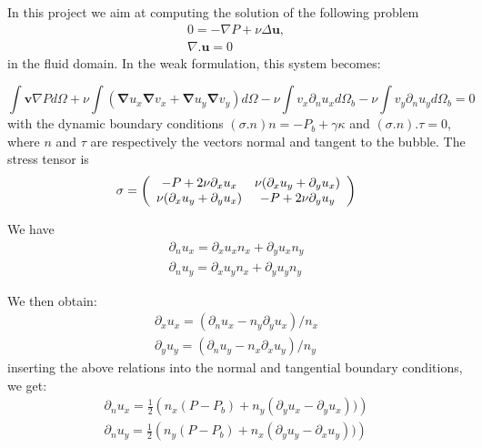 \documentclass[11pt]{article}
\begin{document}
In this project we aim at computing the solution of the following problem
\begin{align}
    0=-\nabla P+\nu \Delta  \mathbf u, \\
    \nabla.{\mathbf u}=0
\end{align}
in the fluid domain.
In the weak formulation, this system becomes:

\begin{equation}
\int {\mathbf v}\nabla P d\Omega+\nu\int \left({\mathbf \nabla} u_x {\mathbf \nabla} v_x + {\mathbf \nabla} u_y {\mathbf \nabla} v_y \right)d\Omega
-\nu \int v_x\partial_n u_x d\Omega_b-\nu \int v_y\partial_n u_y d\Omega_b=0
\end{equation}
with the dynamic boundary conditions $(\sigma.n)n=-P_b+\gamma \kappa$ and $(\sigma.n).\tau=0$, where $n$ and $\tau$ are respectively the vectors normal and tangent to the bubble.
The stress tensor is
\begin{equation}
    \sigma=\left(
    \begin{array}{cc}
    -P +2\nu \partial_x u_x &\nu(\partial_x u_y+\partial_y u_x)\cr
    \nu(\partial_x u_y+\partial_y u_x) &-P +2\nu \partial_y u_y
    \end{array}
    \right)
\end{equation}

We have
\begin{align}
    \partial_n u_x=\partial_x u_x n_x+\partial_y u_x n_y\\
    \partial_n u_y=\partial_x u_y n_x+\partial_y u_y n_y
\end{align}

We then obtain:
\begin{align}
    \partial_x u_x=\left(\partial_n u_x -n_y \partial_y u_x\right)/n_x\\
    \partial_y u_y=\left(\partial_n u_y-n_x \partial_x u_y\right)/n_y
\end{align}
inserting the above relations into the normal and tangential boundary conditions, we get:
\begin{align}
    \partial_n u_x=\frac{1}{2}\left(n_x(P-P_b)+n_y\left(\partial_y u_x-\partial_y u_x\right))\right)\\
    \partial_n u_y=\frac{1}{2}\left(n_y(P-P_b)+n_x\left(\partial_y u_y-\partial_x u_y\right))\right)
\end{align}
\end{document}
